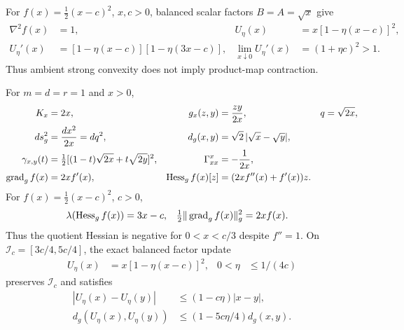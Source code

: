 \begin{proposition}
For $f(x)=\frac12(x-c)^2$, $x,c>0$, balanced scalar factors
$B=A=\sqrt x$ give
\begin{align}
\nabla^2f(x)&=1,&
U_\eta(x)&=x[1-\eta(x-c)]^2,\\
U_\eta'(x)&=[1-\eta(x-c)][1-\eta(3x-c)],&
\lim_{x\downarrow0}U_\eta'(x)&=(1+\eta c)^2>1 .
\end{align}
Thus ambient strong convexity does not imply product-map contraction.
\end{proposition}


\begin{theorem}
\label{thm:rigid-scalar-contraction}
For $m=d=r=1$ and $x>0$,
\begin{align}
K_x&=2x,&g_x(z,y)&=\frac{zy}{2x},&
q&=\sqrt{2x},\\
ds_g^2&=\frac{dx^2}{2x}=dq^2,&
d_g(x,y)&=\sqrt2\,|\sqrt x-\sqrt y|,\\
\gamma_{x,y}(t)
&=\tfrac12[(1-t)\sqrt{2x}+t\sqrt{2y}]^2,&
\Gamma^x_{xx}&=-\frac1{2x},\\
\operatorname{grad}_g f(x)&=2xf'(x),&
\operatorname{Hess}_g f(x)[z]&=(2xf''(x)+f'(x))z .
\label{eq:rigid-scalar-geometry}
\end{align}
For $f(x)=\tfrac12(x-c)^2$, $c>0$,
\begin{align}
\lambda(\operatorname{Hess}_g f(x))&=3x-c,&
\tfrac12\|\operatorname{grad}_g f(x)\|_g^2&=2xf(x).
\end{align}
Thus the quotient Hessian is negative for $0<x<c/3$ despite
$f''=1$.
On $\mathcal I_c=[3c/4,5c/4]$, the exact balanced factor update
\begin{align}
U_\eta(x)&=x[1-\eta(x-c)]^2,&0<\eta&\leq1/(4c)
\end{align}
preserves $\mathcal I_c$ and satisfies
\begin{align}
|U_\eta(x)-U_\eta(y)|
&\leq(1-c\eta)|x-y|,\\
d_g(U_\eta(x),U_\eta(y))
&\leq(1-5c\eta/4)d_g(x,y).
\label{eq:rigid-scalar-contraction}
\end{align}
\end{theorem}
